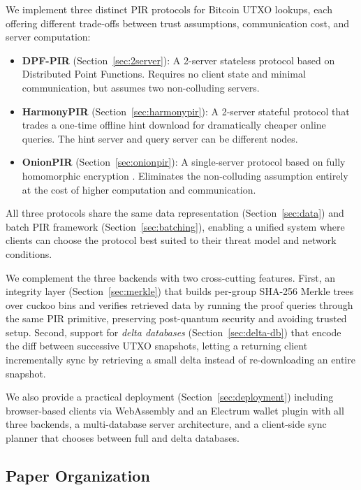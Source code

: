 We implement three distinct PIR protocols for Bitcoin UTXO lookups, each offering different trade-offs between trust assumptions, communication cost, and server computation:
\begin{itemize}[nolistsep,leftmargin=*]
    \item \textbf{DPF-PIR} (Section~\ref{sec:2server}): A 2-server stateless protocol based on Distributed Point Functions. Requires no client state and minimal communication, but assumes two non-colluding servers.
    \item \textbf{HarmonyPIR} (Section~\ref{sec:harmonypir}): A 2-server stateful protocol \cite{ar26fpe} that trades a one-time offline hint download for dramatically cheaper online queries. The hint server and query server can be different nodes.
    \item \textbf{OnionPIR} (Section~\ref{sec:onionpir}): A single-server protocol based on fully homomorphic encryption \cite{onionpir21,onionpirv2}. Eliminates the non-colluding assumption entirely at the cost of higher computation and communication.
\end{itemize}

All three protocols share the same data representation (Section~\ref{sec:data}) and batch PIR framework (Section~\ref{sec:batching}), enabling a unified system where clients can choose the protocol best suited to their threat model and network conditions.

We complement the three backends with two cross-cutting features. First, an integrity layer (Section~\ref{sec:merkle}) that builds per-group SHA-256 Merkle trees over cuckoo bins and verifies retrieved data by running the proof queries through the same PIR primitive, preserving post-quantum security and avoiding trusted setup. Second, support for \emph{delta databases} (Section~\ref{sec:delta-db}) that encode the diff between successive UTXO snapshots, letting a returning client incrementally sync by retrieving a small delta instead of re-downloading an entire snapshot.

We also provide a practical deployment (Section~\ref{sec:deployment}) including browser-based clients via WebAssembly \cite{wasm} and an Electrum wallet plugin \cite{electrum} with all three backends, a multi-database server architecture, and a client-side sync planner that chooses between full and delta databases.

\subsection{Paper Organization}

